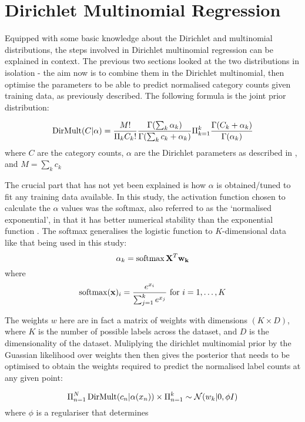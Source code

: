 \section{Dirichlet Multinomial Regression}
Equipped with some basic knowledge about the Dirichlet and multinomial distributions, the steps involved in Dirichlet multinomial regression can be explained in context. The previous two sections looked at the two distributions in isolation - the aim now is to combine them in the Dirichlet multinomial, then optimise the parameters to be able to predict normalised category counts given training data, as previously described. The following formula is the joint prior distribution:

\begin{equation}
    \operatorname{DirMult}(C|\alpha) = \frac{M!}{\Pi_k C_k!} \frac{\Gamma(\sum_k \alpha_k)}{\Gamma(\sum_k c_k + \alpha_k)} \Pi_{k=1}^k \frac{\Gamma(C_k + \alpha_k)}{\Gamma(\alpha_k)}
\end{equation}
where $C$ are the category counts, $\alpha$ are the Dirichlet parameters as described in , and $M = \sum_k c_k$

The crucial part that has not yet been explained is how $\alpha$ is obtained/tuned to fit any training data available. In this study, the activation function chosen to calculate the $\alpha$ values was the softmax, also referred to as the `normalised exponential', in that it has better numerical stability than the exponential function . The softmax generalises the logistic function to $K$-dimensional data like that being used in this study:
\begin{equation}
    \alpha_k = \operatorname{softmax}{\mathbf{X}^T \mathbf{w_k}}
\end{equation}
where \begin{equation}
    \operatorname{softmax}(\mathbf{x})_i = \frac{e^{x_i}}{\sum_{j=1}^k e^{x_j}} \text{ for } i = 1, \ldots, K
\end{equation}

The weights $w$ here are in fact a matrix of weights with dimensions $(K \times D)$, where $K$ is the number of possible labels across the dataset, and $D$ is the dimensionality of the dataset. Muliplying the dirichlet multinomial prior by the Guassian likelihood over weights then then gives the posterior that needs to be optimised to obtain the weights required to predict the normalised label counts at any given point:

\begin{equation}
    \Pi_{n=1}^N \operatorname{DirMult} (c_n | \alpha(x_n)) \times \Pi_{n=1}^k \sim \mathcal{N}(w_k | 0, \phi I)
\end{equation}
where $\phi$ is a regulariser that determines 

